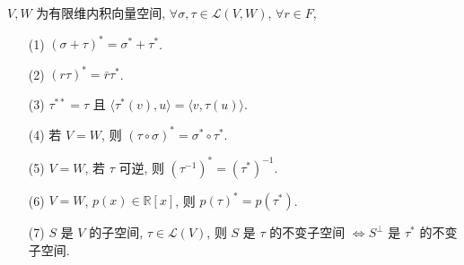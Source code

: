 \documentclass{note}
\begin{document}
\begin{thm}[(课本定理 10.2)]
    $V,W$ 为有限维内积向量空间, $\forall\sigma,\tau\in\mathcal{L}(V,W)$, $\forall r\in F$,
    \begin{itemize}
        \item[(1)] $(\sigma+\tau)^*=\sigma^*+\tau^*$.
        \item[(2)] $(r\tau)^*=\bar{r}\tau^*$.
        \item[(3)] $\tau^{**}=\tau$ 且 $\langle\tau^*(v),u\rangle=\langle v,\tau(u)\rangle$.
        \item[(4)] 若 $V=W$, 则 $(\tau\circ\sigma)^*=\sigma^*\circ\tau^*$.
        \item[(5)] $V=W$, 若 $\tau$ 可逆, 则 $(\tau^{-1})^*=(\tau^*)^{-1}$.
        \item[(6)] $V=W$, $p(x)\in\mathbb{R}[x]$, 则 $p(\tau)^*=p(\tau^*)$.
        \item[(7)] $S$ 是 $V$ 的子空间, $\tau\in\mathcal{L}(V)$, 则 $S$ 是 $\tau$ 的不变子空间 $\Longleftrightarrow S^{\perp}$ 是 $\tau^*$ 的不变子空间.
    \end{itemize}
\end{thm}
\end{document}
